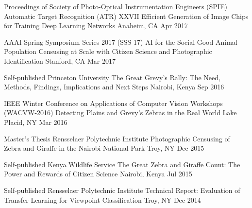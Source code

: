 

\begin{cventries}

  \cventryshort
    {Proceedings of Society of Photo-Optical Instrumentation Engineers (SPIE) \dotSep Automatic Target Recognition (ATR) XXVII} %
    {Efficient Generation of Image Chips for Training Deep Learning Networks} %
    {Anaheim, CA} %
    {Apr 2017} %

  \cventryshort
    {AAAI Spring Symposium Series 2017 (SSS-17) \dotSep AI for the Social Good} %
    {Animal Population Censusing at Scale with Citizen Science and Photographic Identification} %
    {Stanford, CA} %
    {Mar 2017} %

  \cventryshort
    {Self-published \dotSep Princeton University} %
    {The Great Grevy’s Rally: The Need, Methods, Findings, Implications and Next Steps} %
    {Nairobi, Kenya} %
    {Sep 2016} %

  \cventryshort
    {IEEE Winter Conference on Applications of Computer Vision Workshops (WACVW-2016)} %
    {Detecting Plains and Grevy's Zebras in the Real World} %
    {Lake Placid, NY} %
    {Mar 2016} %

  \cventryshort
    {Master's Thesis \dotSep Rensselaer Polytechnic Institute} %
    {Photographic Censusing of Zebra and Giraffe in the Nairobi National Park} %
    {Troy, NY} %
    {Dec 2015} %

  \cventryshort
    {Self-published \dotSep Kenya Wildlife Service} %
    {The Great Zebra and Giraffe Count: The Power and Rewards of Citizen Science} %
    {Nairobi, Kenya} %
    {Jul 2015} %

  \cventryshort
    {Self-published \dotSep Rensselaer Polytechnic Institute} %
    {Technical Report: Evaluation of Transfer Learning for Viewpoint Classification} %
    {Troy, NY} %
    {Dec 2014} %


\end{cventries}

